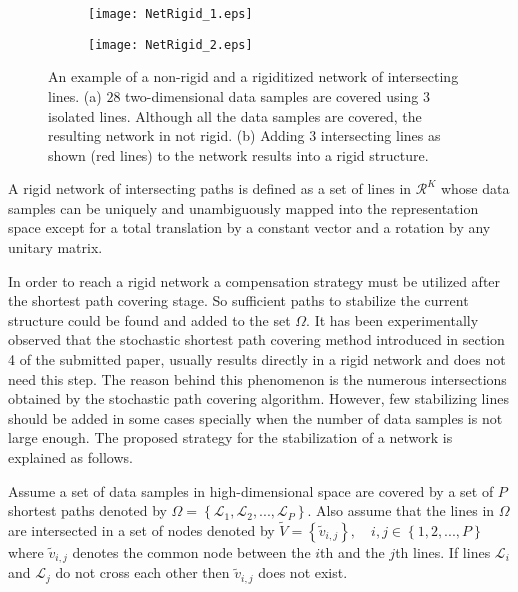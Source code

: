 \documentclass[10pt,journal,cspaper,compsoc]{IEEEtran}
\let\MYoriglatexcaption\caption
\renewcommand{\caption}[2][\relax]{\MYoriglatexcaption[#2]{#2}}
\begin{document}
\begin{figure}[t]
\centering
        \begin{subfigure}[b]{0.22\textwidth}
                \texttt{[image: NetRigid\_1.eps]}
                \caption{}
                \label{fig_6_1_a}
        \end{subfigure}\begin{subfigure}[b]{0.22\textwidth}
                \texttt{[image: NetRigid\_2.eps]}
                \caption{}
                \label{fig_6_1_b}
        \end{subfigure}
        \caption{{\small An example of a non-rigid and a rigiditized network of intersecting lines. (a) $28$ two-dimensional data samples are covered using $3$ isolated lines. Although all the data samples are covered, the resulting network in not rigid. (b) Adding $3$ intersecting lines as shown (red lines) to the network results into a rigid structure.}}
 \label{fig_6_1}
\end{figure}

\begin{framed}
\begin{myDefinition}
A rigid network of intersecting paths is defined as a set of lines in $\mathcal{R}^K$ whose data samples can be uniquely and unambiguously mapped into the representation space except for a total translation by a constant vector and a rotation by any unitary matrix.
\end{myDefinition}
\end{framed}

In order to reach a rigid network a compensation strategy must be utilized after the shortest path covering stage. So sufficient paths to stabilize the current structure could be found and added to the set $\Omega$. It has been experimentally observed that the stochastic shortest path covering method introduced in section 4 of the submitted paper, usually results directly in a rigid network and does not need this step. The reason behind this phenomenon is the numerous intersections obtained by the stochastic path covering algorithm. However, few stabilizing lines should be added in some cases specially when the number of data samples is not large enough. The proposed strategy for the stabilization of a network is explained as follows.

Assume a set of data samples in high-dimensional space are covered by a set of $P$ shortest paths denoted by $\Omega=\left\{\mathcal{L}_1,\mathcal{L}_2,...,\mathcal{L}_P\right\}$. Also assume that the lines in $\Omega$ are intersected in a set of nodes denoted by $\tilde{V}=\left\{\tilde{v}_{i,j}\right\},\quad i,j\in \left\{1,2,...,P\right\}$ where $\tilde{v}_{i,j}$ denotes the common node between the $i$th and the $j$th lines. If lines $\mathcal{L}_i$ and $\mathcal{L}_j$ do not cross each other then $\tilde{v}_{i,j}$ does not exist.
\end{document}
